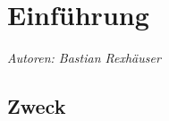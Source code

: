 \documentclass[enabledeprecatedfontcommands,fontsize=11pt,paper=a4,twoside]{scrartcl}
\begin{document}
\begin{tabular}{p{}cp{12cm}}
\end{tabular}
\\ \\ \\ \newpage

\thispagestyle{empty}
\cleardoublepage


\newpage
\section{Einführung}
\label{sec:intro}
\emph{Autoren: Bastian Rexhäuser}
\subsection{Zweck}
\end{document}
